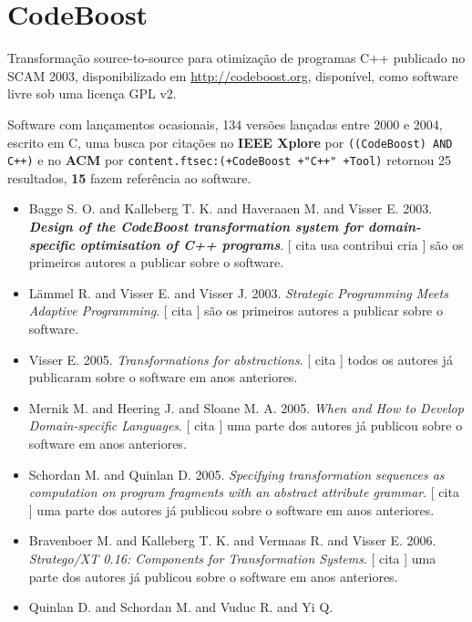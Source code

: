 \section{CodeBoost}

Transformação source-to-source para otimização de programas C++
publicado no SCAM 2003,
disponibilizado em \url{http://codeboost.org},
disponível,
como software livre
sob uma licença GPL v2.

Software com lançamentos ocasionais,
134 versões lançadas
entre 2000 e 2004,
escrito em C,
uma busca por citações no {\bf IEEE Xplore} por
\texttt{((CodeBoost) AND C++)}
e no {\bf ACM} por
\texttt{content.ftsec:(+CodeBoost +"C++" +Tool)}
retornou
25 resultados,
{\bf 15} fazem referência ao software.

\begin{itemize}
\item Bagge S. O. and Kalleberg T. K. and Haveraaen M. and Visser E.
      2003.
        \textbf{\textit{ Design of the CodeBoost transformation system for domain-specific optimisation of C++ programs}}.
      [
          cita
          usa
          contribui
          cria
      ]
são os primeiros autores a publicar sobre o software.
\item L\"{a}mmel R. and Visser E. and Visser J.
      2003.
        \textit{ Strategic Programming Meets Adaptive Programming}.
      [
          cita
      ]
são os primeiros autores a publicar sobre o software.
\item Visser E.
      2005.
        \textit{ Transformations for abstractions}.
      [
          cita
      ]
todos os autores já publicaram sobre o software em anos anteriores.
\item Mernik M. and Heering J. and Sloane M. A.
      2005.
        \textit{ When and How to Develop Domain-specific Languages}.
      [
          cita
      ]
uma parte dos autores já publicou sobre o software em anos anteriores.
\item Schordan M. and Quinlan D.
      2005.
        \textit{ Specifying transformation sequences as computation on program fragments with an abstract attribute grammar}.
      [
          cita
      ]
uma parte dos autores já publicou sobre o software em anos anteriores.
\item Bravenboer M. and Kalleberg T. K. and Vermaas R. and Visser E.
      2006.
        \textit{ Stratego/XT 0.16: Components for Transformation Systems}.
      [
          cita
      ]
uma parte dos autores já publicou sobre o software em anos anteriores.
\item Quinlan D. and Schordan M. and Vuduc R. and Yi Q.

\end{itemize}
